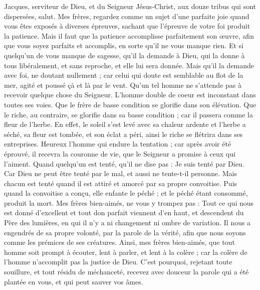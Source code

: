 \begin{multicols}{2}
\VerseOne{}Jacques, serviteur de Dieu, et du Seigneur Jésus-Christ, aux douze tribus qui sont dispersées, salut.
Mes frères, regardez comme un sujet d'une parfaite joie quand vous êtes exposés à diverses épreuves,
sachant que l'épreuve de votre foi produit la patience.
Mais il faut que la patience accomplisse parfaitement son œuvre, afin que vous soyez parfaits et accomplis, en sorte qu’il ne vous manque rien.
Et si quelqu'un de vous manque de sagesse, qu'il la demande à Dieu, qui la donne à tous libéralement, et sans reproche, et elle lui sera donnée.
Mais qu'il la demande avec foi, ne doutant nullement ; car celui qui doute est semblable au flot de la mer, agité et poussé çà et là par le vent.
Qu’un tel homme ne s'attende pas à recevoir quelque chose du Seigneur.
L'homme double de coeur est inconstant dans toutes ses voies.
Que le frère de basse condition se glorifie dans son élévation.
Que le riche, au contraire, se glorifie dans sa basse condition ; car il passera comme la fleur de l'herbe.
En effet, le soleil s'est levé avec sa chaleur ardente et l'herbe a séché, sa fleur est tombée, et son éclat a péri, ainsi le riche se flétrira dans ses entreprises.
Heureux l'homme qui endure la tentation ; car après avoir été éprouvé, il recevra la couronne de vie, que le Seigneur a promise à ceux qui l'aiment.
Quand quelqu'un est tenté, qu'il ne dise pas : Je suis tenté par Dieu. Car Dieu ne peut être tenté par le mal, et aussi ne tente-t-il personne.
Mais chacun est tenté quand il est attiré et amorcé par sa propre convoitise.
Puis quand la convoitise a conçu, elle enfante le péché ; et le péché étant consommé, produit la mort.
Mes frères bien-aimés, ne vous y trompez pas :
Tout ce qui nous est donné d'excellent et tout don parfait viennent d'en haut, et descendent du Père des lumières, en qui il n'y a ni changement ni ombre de variation.
Il nous a engendrés de sa propre volonté, par la parole de la vérité, afin que nous soyons comme les prémices de ses créatures.
Ainsi, mes frères bien-aimés, que tout homme soit prompt à écouter, lent à parler, et lent à la colère ;
car la colère de l'homme n'accomplit pas la justice de Dieu.
C'est pourquoi, rejetant toute souillure, et tout résidu de méchanceté, recevez avec douceur la parole qui a été plantée en vous, et qui peut sauver vos âmes.

\end{multicols}

